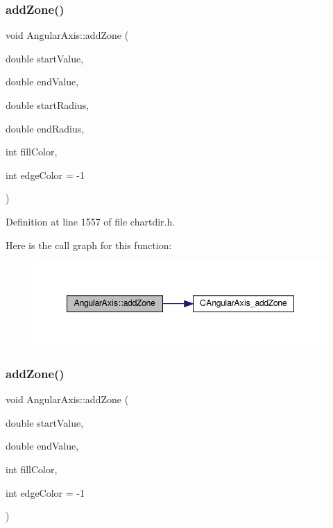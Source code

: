 \subsubsection{\texorpdfstring{add\+Zone()}{addZone()}\hspace{0.1cm}{\footnotesize\ttfamily [1/2]}}
{\footnotesize\ttfamily void Angular\+Axis\+::add\+Zone (\begin{DoxyParamCaption}\item[{double}]{start\+Value,  }\item[{double}]{end\+Value,  }\item[{double}]{start\+Radius,  }\item[{double}]{end\+Radius,  }\item[{int}]{fill\+Color,  }\item[{int}]{edge\+Color = {\ttfamily -\/1} }\end{DoxyParamCaption})\hspace{0.3cm}{\ttfamily [inline]}}



Definition at line 1557 of file chartdir.\+h.

Here is the call graph for this function\+:
\nopagebreak
\begin{figure}[H]
\begin{center}
\leavevmode
\includegraphics[width=348pt]{class_angular_axis_a0e99a07d920a902b3fa57e8a3c272004_cgraph}
\end{center}
\end{figure}
\mbox{\label{class_angular_axis_a53f7a154799715aa97d16d5140a7de17}} 
\subsubsection{\texorpdfstring{add\+Zone()}{addZone()}\hspace{0.1cm}{\footnotesize\ttfamily [2/2]}}
{\footnotesize\ttfamily void Angular\+Axis\+::add\+Zone (\begin{DoxyParamCaption}\item[{double}]{start\+Value,  }\item[{double}]{end\+Value,  }\item[{int}]{fill\+Color,  }\item[{int}]{edge\+Color = {\ttfamily -\/1} }\end{DoxyParamCaption})\hspace{0.3cm}{\ttfamily [inline]}}



